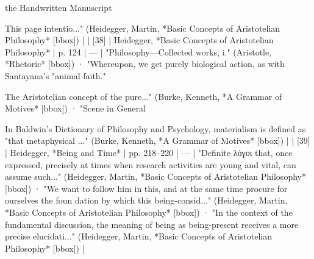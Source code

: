 the Handwritten Manuscript

This page intentio..." (Heidegger, Martin, *Basic Concepts of Aristotelian Philosophy* [bbox]) |
| [38] | Heidegger, *Basic Concepts of Aristotelian Philosophy* | p. 124 | — | "Philosophy—Collected works, i." (Aristotle, *Rhetoric* [bbox]) · "Whereupon, we get purely biological action, as with Santayana's "animal faith."

The Aristotelian concept of the pure..." (Burke, Kenneth, *A Grammar of Motives* [bbox]) · "Scene in General

In Baldwin's Dictionary of Philosophy and Psychology, materialism is defined as "that metaphysical ..." (Burke, Kenneth, *A Grammar of Motives* [bbox]) |
| [39] | Heidegger, *Being and Time* | pp. 218–220 | — | "Definite λόγοι that, once expressed, precisely at times when research activities are young and vital, can assume such..." (Heidegger, Martin, *Basic Concepts of Aristotelian Philosophy* [bbox]) · "We want to follow him in this, and at the same time procure for ourselves the foun­ dation by which this being-consid..." (Heidegger, Martin, *Basic Concepts of Aristotelian Philosophy* [bbox]) · "In the context of the fundamental discussion, the meaning of being as being-present receives a more precise elucidati..." (Heidegger, Martin, *Basic Concepts of Aristotelian Philosophy* [bbox]) |
